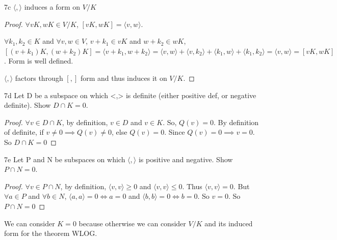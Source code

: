 \documentclass{article}
\newcommand{\angles}[1]{\langle #1 \rangle}
\begin{document}
\begin{claim}{7c}\label{Claim 7c.}
    $\angles{,}$  induces a form on $V / K$ 
\end{claim}
\begin{proof}
    $\forall vK, wK \in V / K$, $[vK, wK] = \angles{v, w}$.
    
    $\forall k_1, k_2 \in K$ and $\forall v, w \in V$, $v + k_1 \in vK$ and $w + k_2 \in wK$, $[(v + k_1)K, (w + k_2)K] = \angles{v + k_1, w + k_2} = \angles{v, w} + \angles{v, k_2} + \angles{k_1, w} + \angles{k_1, k_2} = \angles{v, w} = [vK, wK]$. Form is well defined.
    
    $\angles{ , }$ factors through $[ , ]$ form and thus induces it on $V / K$.    

\end{proof}
\begin{claim}{7d}\label{Claim 7d.}
    Let D be a subspace on which <,> is definite (either positive def, or negative definite). Show $D \cap K = 0$.
\end{claim}
\begin{proof}
    $\forall v \in D \cap K$, by definition, $v \in D$ and $v \in K$. So, $Q(v) = 0$. By definition of definite, if $v \neq 0 \implies Q(v) \neq 0$, else $Q(v) = 0$. Since $Q(v) = 0 \implies v = 0$. So $D \cap K = 0$         
\end{proof}
\begin{claim}{7e}\label{Claim 7e.}
    Let P and N be subspaces on which $\angles{, }$ is positive and negative. Show $P \cap N = 0$. 
\end{claim}
\begin{proof}
    $\forall v \in P \cap N$, by definition, $\angles{v, v} \geq 0$ and $\angles{v, v} \leq 0$. Thus $\angles{v, v} = 0$. But $\forall a \in P$ and $\forall b \in N$, $\angles{a, a} = 0 \iff a = 0$ and $\angles{b, b} = 0 \iff b = 0$. So $v = 0$. So $P \cap N = 0$
\end{proof}

We can consider $K = 0$ because otherwise we can consider $V / K$ and its induced form for the theorem WLOG.  
\end{document}
